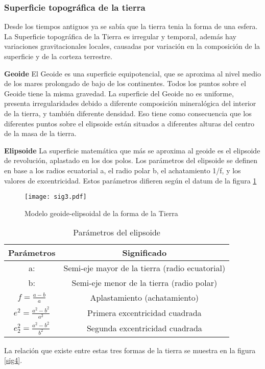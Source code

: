\subsubsection{Superficie topográfica de la tierra}
Desde los tiempos antiguos ya se sabía que la tierra tenia la forma de una esfera. La Superficie  topográfica de la Tierra es irregular y temporal, además hay variaciones gravitacionales locales, causadas por variación en la composición de la superficie y de la corteza terrestre.  

\textbf{Geoide}
El Geoide es una superficie equipotencial, que se aproxima al nivel medio de los mares prolongado de bajo de los continentes. Todos los puntos sobre el Geoide tiene la misma gravedad. La superficie del Geoide no es uniforme, presenta irregularidades debido a diferente composición mineralógica del interior de la tierra, y también diferente densidad. Eso tiene  como consecuencia que los diferentes puntos sobre el elipsoide están situados a diferentes alturas del centro de la masa de la tierra.

\textbf{Elipsoide}
La superficie matemática que más se aproxima al geoide es el elipsoide de revolución, aplastado en los dos polos. Los parámetros del elipsoide se definen en base a los radios ecuatorial a, el radio polar b, el achatamiento 1/f, y los valores de excentricidad. Estos parámetros difieren según el datum de la figura \ref{sig3}

\begin{figure}[h!]
\centering
  \texttt{[image: sig3.pdf]}
  \caption{Modelo geoide-elipsoidal de la forma de la Tierra}
  \label{sig3}
\end{figure}
\begin{table}[h!]
\centering
  \begin{tabular}{@{}cc@{}}
  \toprule
  Parámetros                        & Significado                                    \\ \midrule
  a:                                & Semi-eje mayor de la tierra (radio ecuatorial) \\
  b:                                & Semi-eje menor de la tierra (radio polar)      \\
  $f = \frac{a - b}{a}$             & Aplastamiento (achatamiento)                   \\
  $e^2 = \frac{a^2 -b^2}{a^2}$      & Primera excentricidad cuadrada                 \\
  $e_2^{2} = \frac{a^2 - b^2}{b^2}$ & Segunda excentricidad cuadrada                 \\ \bottomrule
  \end{tabular}
  \caption{Parámetros del elipsoide}
  \label{tabsig1}
  \end{table}
  La relación que existe entre estas tres formas de la tierra se muestra en la figura \ref{sig4}.

